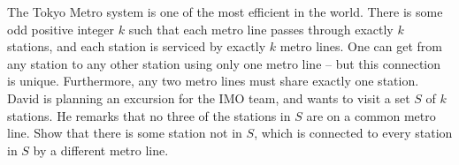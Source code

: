 The Tokyo Metro system is one of the most efficient in the world.
There is some odd positive integer $k$ such that each metro line passes through exactly $k$ stations,
and each station is serviced by exactly $k$ metro lines.
One can get from any station to any other station using only one metro line -- but this connection is unique.
Furthermore, any two metro lines must share exactly one station. 
David is planning an excursion for the IMO team, and wants to visit a set $S$ of $k$ stations.
He remarks that no three of the stations in $S$ are on a common metro line.
Show that there is some station not in $S$, which is connected to every station in $S$ by a different metro line.
